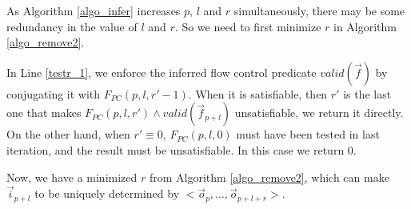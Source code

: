 \documentclass[runningheads,a4paper,orivec]{llncs}
\begin{document}
As Algorithm \ref{algo_infer} increases $p$, $l$ and $r$ simultaneously,
there may be some redundancy in the value of $l$ and $r$.
So we need to first minimize $r$ in Algorithm \ref{algo_remove2}.


In Line \ref{testr_1},
we enforce the inferred flow control predicate $valid(\vec{f})$ by
conjugating it with $F_{PC}(p,l,r'-1)$.
When it is satisfiable,
then $r'$ is the last one that makes $F_{PC}(p,l,r')\wedge valid(\vec{f}_{p+l})$ unsatisfiable,
we return it directly.
On the other hand,
when $r'\equiv 0$,
$F_{PC}(p,l,0)$ must have been tested in last iteration,
and the result must be unsatisfiable.
In this case we return $0$.

% 
% 

Now, 
we have a minimized $r$ from Algorithm \ref{algo_remove2},
which can make $\vec{i}_{p+l}$ to be uniquely determined by $<\vec{o}_{p},\dots,\vec{o}_{p+l+r}>$.
\end{document}
